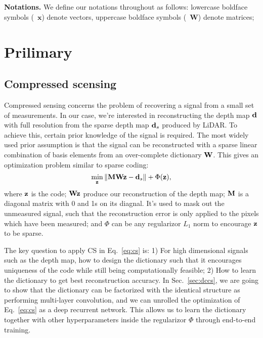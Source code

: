 \\
\\
\noindent\textbf{Notations.} We define our notations throughout as follows: lowercase boldface symbols (\eg~$\mathbf{x}$) denote vectors, uppercase boldface symbols (\eg~$\mathbf{W}$) denote matrices;
 
\section{Prilimary}
\subsection{Compressed scensing}
Compressed sensing concerns the problem of recovering a signal from a small set of measurements. In our case, we're interested in reconstructing the depth map $\mathbf{d}$ with full resolution from the sparse depth map $\mathbf{d}_s$ produced by LiDAR. To achieve this, certain prior knowledge of the signal is required. The most widely used prior assumption is that the signal can be reconstructed with a sparse linear combination of basis elements from an over-complete dictionary $\mathbf{W}$. This gives an optimization problem similar to sparse coding:
\begin{equation}
    \min_{\mathbf{z}} \Vert \mathbf{M}\mathbf{W}\mathbf{z} - \mathbf{d}_s \Vert + \Phi(\mathbf{z}),
    \label{eq:cs}
\end{equation}
where $\mathbf{z}$ is the code; $\mathbf{W}\mathbf{z}$ produce our reconstruction of the depth map; $\mathbf{M}$ is a diagonal matrix with 0 and 1s on its diagnal. It's used to mask out the unmeasured signal, such that the reconstruction error is only applied to the pixels which have been measured; and $\Phi$ can be any regularizor \eg $L_1$ norm to encourage $\mathbf{z}$ to be sparse.

The key question to apply CS in Eq.~\ref{eq:cs} is: 1) For high dimensional signals such as the depth map, how to design the dictionary such that it encourages uniqueness of the code while still being computationally feasible; 2) How to learn the dictionary to get best reconstruction accuracy. In Sec.~\ref{sec:dccs}, we are going to show that the dictionary can be factorized with the identical structure as performing multi-layer convolution, and we can unrolled the optimization of  Eq.~\ref{eq:cs} as a deep recurrent network. This allows us to learn the dictionary together with other hyperparameters inside the regularizor $\Phi$ through end-to-end training.

